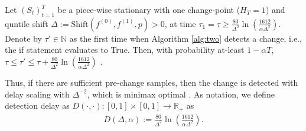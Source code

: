 

\begin{proposition}
Let $(S_t)_{t=1}^T$ be a piece-wise stationary with one change-point ($H_T = 1$) and quntile shift $\Delta := \text{Shift}(f^{(0)}, f^{(1)}, p) > 0$, at time $\tau_1 = \tau \geq \frac{80}{\Delta^2}\ln \left( \frac{1612}{\alpha \Delta^2}\right)$. Denote by $\tau' \in \mathbb{N}$ as the first time when Algorithm \ref{alg:two} detects a change, i.e., the {\ttfamily if} statement evaluates to {\ttfamily True}. Then, with probability at-least $1-\alpha T$, $ \tau \leq \tau' \leq \tau + \frac{80}{\Delta^2}\ln \left( \frac{1612}{\alpha \Delta^2}\right)$ .
\label{prop:delay_bound}
\end{proposition}

Thus, if there are sufficient pre-change samples, then the change is detected with delay scaling with $\Delta^{-2}$, which is minimax optimal \cite{maillard2019sequential, JMLR:v23:20-1384, shekhar2023sequential}.
As notation, we define detection delay as $D(\cdot, \cdot): [0,1]\times [0,1] \to \mathbb{R}_{+}$ as 
\vspace{-0.1em}
\begin{align}
    D(\Delta,\alpha) := \frac{80}{\Delta^2}\ln \left( \frac{1612}{\alpha \Delta^2}\right). \label{eq:delay_shorthand} 
\end{align}
\vspace{-1.5em}

